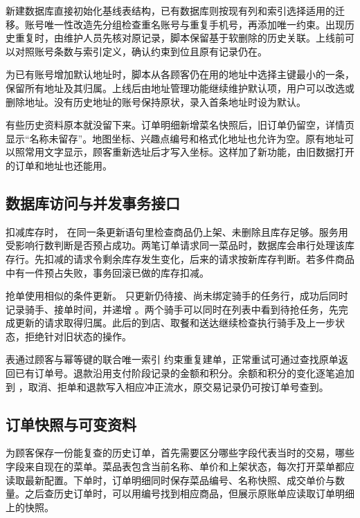 新建数据库直接初始化基线表结构，已有数据库则按现有列和索引选择适用的迁移。账号唯一性改造先分组检查重名账号与重复手机号，再添加唯一约束。出现历史重复时，由维护人员先核对原记录，脚本保留基于软删除的历史关联。上线前可以对照账号条数与索引定义，确认约束到位且原有记录仍在。

为已有账号增加默认地址时，脚本从各顾客仍在用的地址中选择主键最小的一条，保留所有地址及其归属。上线后由地址管理功能继续维护默认项，用户可以改选或删除地址。没有历史地址的账号保持原状，录入首条地址时设为默认。

有些历史资料原本就没留下来。订单明细新增菜名快照后，旧订单仍留空，详情页显示“名称未留存”。地图坐标、兴趣点编号和格式化地址也允许为空。原有地址可以照常用文字显示，顾客重新选址后才写入坐标。这样加了新功能，由旧数据打开的订单和地址也还能用。

\subsection{数据库访问与并发事务接口}

扣减库存时， 在同一条更新语句里检查商品仍上架、未删除且库存足够。服务用受影响行数判断是否预占成功。两笔订单请求同一菜品时，数据库会串行处理该库存行。先扣减的请求令剩余库存发生变化，后来的请求按新库存判断。若多件商品中有一件预占失败，事务回滚已做的库存扣减。

抢单使用相似的条件更新。 只更新仍待接、尚未绑定骑手的任务行，成功后同时记录骑手、接单时间，并递增 。两个骑手可以同时在列表中看到待抢任务，先完成更新的请求取得归属。此后的到店、取餐和送达继续检查执行骑手及上一步状态，拒绝针对旧状态的操作。

 表通过顾客与幂等键的联合唯一索引  约束重复建单，正常重试可通过查找原单返回已有订单号。退款沿用支付阶段记录的金额和积分。余额和积分的变化逐笔追加到 ，取消、拒单和退款写入相应冲正流水，原交易记录仍可按订单号查到。

\subsection{订单快照与可变资料}

为顾客保存一份能复查的历史订单，首先需要区分哪些字段代表当时的交易，哪些字段来自现在的菜单。菜品表包含当前名称、单价和上架状态，每次打开菜单都应读取最新配置。下单时，订单明细同时保存菜品编号、名称快照、成交单价与数量。之后查历史订单时，可以用编号找到相应商品，但展示原账单应读取订单明细上的快照。

